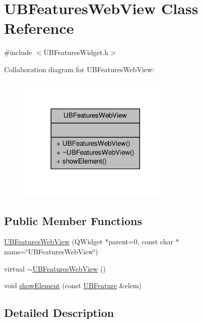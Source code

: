 \hypertarget{class_u_b_features_web_view}{\section{U\-B\-Features\-Web\-View Class Reference}
\label{dc/d06/class_u_b_features_web_view}
}


{\ttfamily \#include $<$U\-B\-Features\-Widget.\-h$>$}



Collaboration diagram for U\-B\-Features\-Web\-View\-:
\nopagebreak
\begin{figure}[H]
\begin{center}
\leavevmode
\includegraphics[width=212pt]{dc/d14/class_u_b_features_web_view__coll__graph}
\end{center}
\end{figure}
\subsection*{Public Member Functions}
\begin{DoxyCompactItemize}
\item 
\hyperlink{class_u_b_features_web_view_a8b49f4c79f98f8255f63b17fa3d23a36}{U\-B\-Features\-Web\-View} (Q\-Widget $\ast$parent=0, const char $\ast$name=\char`\"{}U\-B\-Features\-Web\-View\char`\"{})
\item 
virtual \hyperlink{class_u_b_features_web_view_af642eab099f1931ef8faf1a95501bc55}{$\sim$\-U\-B\-Features\-Web\-View} ()
\item 
void \hyperlink{class_u_b_features_web_view_ae38e3e0a72a3cdd25eadb58a83d3543e}{show\-Element} (const \hyperlink{class_u_b_feature}{U\-B\-Feature} \&elem)
\end{DoxyCompactItemize}


\subsection{Detailed Description}


